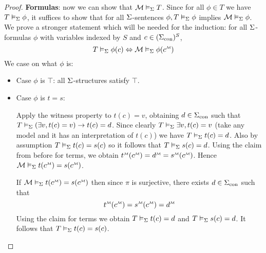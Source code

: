 \begin{proof}
    \textbf{Formulas}:
    now we can show that $\mathcal{M} \vDash_{\Sigma} T$. 
    Since for all
    $\phi \in T$ we have $T \vDash_{\Sigma} \phi$,
    it suffices to show that for all $\Sigma$-sentences
    $\phi, T \vDash_{\Sigma} \phi $ 
    implies $\mathcal{M} \vDash_{\Sigma} \phi$.
    We prove a stronger statement
    which will be needed for the induction:
    for all $\Sigma$-formulas $\phi$ with variables indexed by $S$ and 
    $c \in ({\Sigma}_\mathrm{con})^S$,
    \[
        T \modelsi \phi(c) \iff \MM \modelsi \phi(\mmintp{c})
    \]
    We case on what $\phi$ is:
    \begin{itemize}
        \item Case $\phi$ is $\top$:
        all $\Sigma$-structures satisfy $\top$.
        \item Case $\phi$ is $t = s$: 
            \begin{forward} 
                Apply the witness property to 
                $t(c) = v$,
                obtaining $d \in {\Sigma}_\mathrm{con}$ such that
                $T \vDash_{\Sigma} (\exists v, t(c) = v) \to t(c) = d$.
                Since clearly $T \vDash_{\Sigma} \exists v, t(c) = v$
                (take any model 
                and it has an interpretation of $t(c)$) 
                we have $T \vDash_{\Sigma} t(c) = d$.
                Also by assumption 
                $T \vDash_{\Sigma} t(c) = s(c)$
                so it follows that $T \vDash_{\Sigma} s(c) = d$.
                Using the claim from before for terms, 
                we obtain
                $\mmintp{t}(\mmintp{c}) = \mmintp{d} = 
                \mmintp{s}(\mmintp{c})$.
                Hence $\MM \modelsi t(\mmintp{c}) = s(\mmintp{c})$.
            \end{forward}

            \begin{backward}
                If $\MM \modelsi t(\mmintp{c}) = s(\mmintp{c})$ 
                then since $\pi$ is surjective,
                there exists $d \in {\Sigma}_\mathrm{con}$ such that 
                \[\mmintp{t}(\mmintp{c}) = \mmintp{s}(\mmintp{c})= \mmintp{d}\]
                Using the claim for terms
                we obtain $T \vDash_{\Sigma} t(c) = d$ and 
                $T \vDash_{\Sigma} s(c) = d$.
                It follows that $T \vDash_{\Sigma} t(c) = s(c)$.
            \end{backward}


\end{itemize}
\end{proof}
